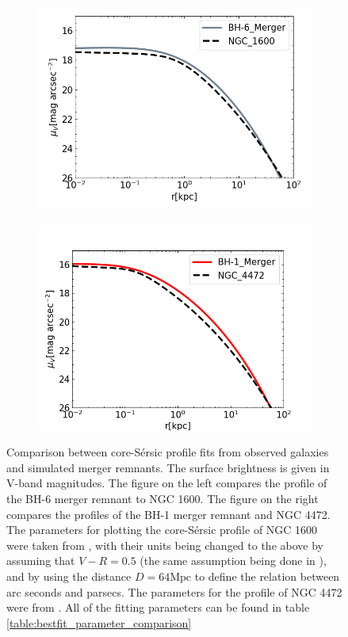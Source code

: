 \documentclass[english, twoside]{HYgradu}
\begin{document}
\begin{figure}
	\centering
	\begin{subfigure}[b]{0.49\textwidth}
		\includegraphics[width=\textwidth]{BH-6_NGC1600.png}
	\end{subfigure}
	\begin{subfigure}[b]{0.49\textwidth}
		\includegraphics[width=\textwidth]{BH-1_NGC4472.png}
	\end{subfigure}
	\caption{Comparison between core-Sérsic profile fits from observed galaxies and simulated merger remnants. The surface brightness is given in V-band magnitudes. The figure on the left compares the profile of the BH-6 merger remnant to NGC 1600. The figure on the right compares the profiles of the BH-1 merger remnant  and NGC 4472. The parameters for plotting the core-Sérsic profile of NGC 1600 were taken from \cite{Thomas2016}, with their units being changed to the above by assuming that $V - R = 0.5$ (the same assumption being done in \cite{Lauer2007}), and by using the distance $D = 64 \mathrm{Mpc}$ \citep{Thomas2016} to define the relation between arc seconds and parsecs. The parameters for the profile of NGC 4472 were from \cite{Rusli2013}. All of the fitting parameters can be found in table \ref{table:bestfit_parameter_comparison}}
	\label{figure:profile_comparison}
\end{figure}
\end{document}
